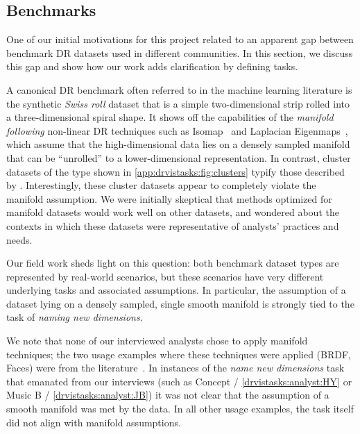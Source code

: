 
\subsection{Benchmarks}
\label{app:drvistasks:dritw:benchmarks}


One of our initial motivations for this project related to an apparent gap between benchmark \ac{DR} datasets used in different communities. 
In this section, we discuss this gap and show how our work adds clarification by defining tasks.

A canonical \ac{DR} benchmark often referred to in the machine learning literature is the synthetic {\it Swiss roll} dataset that is a simple two-dimensional strip rolled into a three-dimensional spiral shape. 
It shows off the capabilities of the {\it manifold following} non-linear \ac{DR} techniques such as Isomap~\cite{Tenenbaum2000} and Laplacian Eigenmaps~\cite{Belkin2001}, which assume that the high-dimensional data lies on a densely sampled manifold that can be ``unrolled'' to a lower-dimensional representation. 
In contrast, cluster datasets of the type shown in \autoref{app:drvistasks:fig:clusters} typify those described by \citet{Sedlmair2012a}. 
Interestingly, these cluster datasets appear to completely violate the manifold assumption. 
We were initially skeptical that methods optimized for manifold datasets would work well on other datasets, and wondered about the contexts in which these datasets were representative of analysts' practices and needs.

Our field work sheds light on this question: both benchmark dataset types are represented by real-world scenarios, but these scenarios have very different underlying tasks and associated assumptions. 
In particular, the assumption of a dataset lying on a densely sampled, single smooth manifold is strongly tied to the task of {\it naming new dimensions}. 

We note that none of our interviewed analysts chose to apply manifold techniques; the two usage examples where these techniques were applied ({\sc BRDF, Faces}) were from the literature~\cite{Matusik2003,Tenenbaum2000}. 
In instances of the {\it name new dimensions} task that emanated from our interviews (such as {\sc Concept} / \ref{drvistasks:analyst:HY} or {\sc Music B} / \ref{drvistasks:analyst:JB}) it was not clear that the assumption of a smooth manifold was met by the data.
In all other usage examples, the task itself did not align with manifold assumptions.

